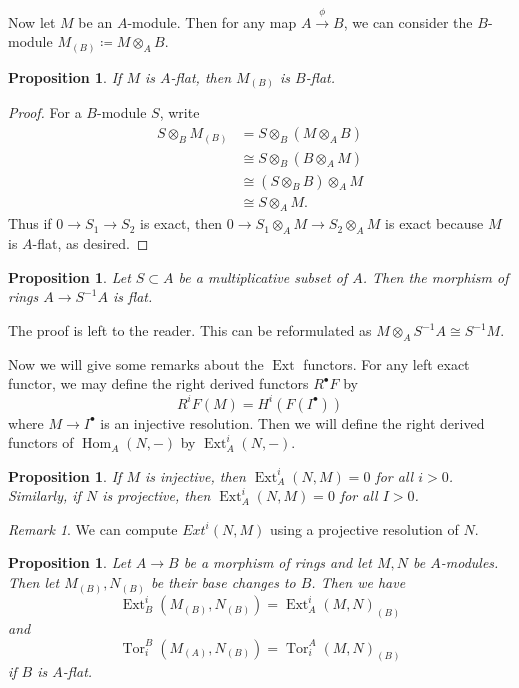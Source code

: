 \documentclass[leqno, openany]{memoir}
\newtheorem{prop}[thm]{Proposition}
\theoremstyle{definition}
\theoremstyle{remark}
\newtheorem{rmk}[thm]{Remark}
\theoremstyle{plain}
\theoremstyle{definition}
\theoremstyle{remark}
\DeclareMathOperator{\Hom}{Hom}
\DeclareMathOperator{\Ext}{Ext}
\DeclareMathOperator{\Tor}{Tor}
\begin{document}
Now let $M$ be an $A$-module. Then for any map $A \xrightarrow{\phi} B$, we can consider the $B$-module $M_{(B)} \coloneqq M \otimes_A B$.

\begin{prop}
    If $M$ is $A$-flat, then $M_{(B)}$ is $B$-flat.
\end{prop}

\begin{proof}
    For a $B$-module $S$, write
    \begin{align*}
        S \otimes_B M_{(B)} &= S \otimes_B (M \otimes_A B) \\
                            &\cong S \otimes_B (B \otimes_A M) \\
                            &\cong (S \otimes_B B) \otimes_A M \\
                            &\cong S \otimes_A M.
    \end{align*}
    Thus if $0 \to S_1 \to S_2$ is exact, then $0 \to S_1 \otimes_A M \to S_2 \otimes_A M$ is exact because $M$ is $A$-flat, as desired.
\end{proof}

\begin{prop}
    Let $S \subset A$ be a multiplicative subset of $A$. Then the morphism of rings $A \to S^{-1}A$ is flat.
\end{prop}

The proof is left to the reader. This can be reformulated as $M \otimes_A S^{-1} A \cong S^{-1}M$.

Now we will give some remarks about the $\operatorname{Ext}$ functors. For any left exact functor, we may define the right derived functors $R^{\bullet} F$ by
\[ R^i F(M) = H^i(F(I^{\bullet})) \]
where $M \to I^{\bullet}$ is an injective resolution. Then we will define the right derived functors of $\Hom_A(N,-)$ by $\Ext_A^i(N,-)$.

\begin{prop}
    If $M$ is injective, then $\Ext_A^i(N,M) = 0$ for all $i > 0$. Similarly, if $N$ is projective, then $\Ext_A^i(N,M) = 0$ for all $I > 0$.
\end{prop}

\begin{rmk}
    We can compute $Ext^i(N,M)$ using a projective resolution of $N$.
\end{rmk}

\begin{prop}
    Let $A \to B$ be a morphism of rings and let $M, N$ be $A$-modules. Then let $M_{(B)}, N_{(B)}$ be their base changes to $B$. Then we have
    \[ \Ext_B^i (M_{(B)}, N_{(B)}) = \Ext_A^i(M,N)_{(B)} \]
    and 
    \[ \Tor_i^B(M_{(A)}, N_{(B)}) = \Tor_i^A(M,N)_{(B)} \]
    if $B$ is $A$-flat.
\end{prop}
\end{document}
